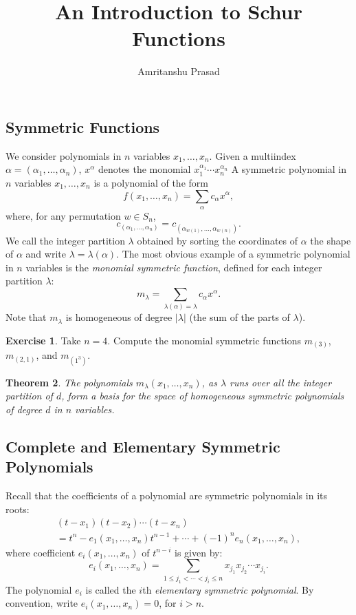 \documentclass[12pt]{amsart}
\title{An Introduction to Schur Functions}
\author{Amritanshu Prasad}
\newtheorem{theorem}{Theorem}[subsection]
\theoremstyle{definition}
\theoremstyle{example}
\newtheorem{exercise}[theorem]{Exercise}
\begin{document}
\maketitle
\renewcommand{\thesubsection}{\arabic{subsection}}
\subsection{Symmetric Functions}
\label{sec:symmetric-functions}
We consider polynomials in $n$ variables $x_1,\dotsc,x_n$.
Given a multiindex $\alpha=(\alpha_1,\dotsc, \alpha_n)$, $x^\alpha$ denotes the monomial $x_1^{\alpha_1}\dotsb x_n^{\alpha_n}$
A symmetric polynomial in $n$ variables $x_1,\dotsc, x_n$ is a polynomial of the form
\begin{displaymath}
  f(x_1,\dotsc, x_n) = \sum_{\alpha} c_\alpha x^\alpha,
\end{displaymath}
where, for any permutation $w\in S_n$,
\begin{displaymath}
  c_{(\alpha_1,\dotsc,\alpha_n)} = c_{(\alpha_{w(1)},\dotsc,\alpha_{w(n)})}.
\end{displaymath}
We call the integer partition $\lambda$ obtained by sorting the coordinates of $\alpha$ the shape of $\alpha$ and write $\lambda = \lambda(\alpha)$.
The most obvious example of a symmetric polynomial in $n$ variables is the \emph{monomial symmetric function}, defined for each integer partition $\lambda$:
\begin{displaymath}
  m_\lambda = \sum_{\lambda(\alpha) = \lambda} c_\alpha x^\alpha.
\end{displaymath}
Note that $m_\lambda$ is homogeneous of degree $|\lambda|$ (the sum of the parts of $\lambda$).
\begin{exercise}
  Take $n=4$. Compute the monomial symmetric functions $m_{(3)}$, $m_{(2,1)}$, and $m_{(1^3)}$.
\end{exercise}
\begin{theorem}
The polynomials $m_\lambda(x_1,\dotsc,x_n)$, as $\lambda$ runs over all the integer partition of $d$, form a basis for the space of homogeneous symmetric polynomials of degree $d$ in $n$ variables.
\end{theorem}
\subsection{Complete and Elementary Symmetric Polynomials}
\label{sec:compl-elem-symm}
Recall that the coefficients of a polynomial are symmetric polynomials in its roots:
\begin{multline}
  \label{eq:elem-id}
  (t-x_1)(t-x_2)\dotsb (t-x_n) \\= t^n - e_1(x_1,\dotsc, x_n)t^{n-1} + \dotsb + (-1)^n e_n(x_1,\dotsc, x_n),
\end{multline}
where coefficient $e_i(x_1,\dotsc, x_n)$ of $t^{n-i}$ is given by:
\begin{equation}
  \label{eq:elem}
  e_i(x_1,\dotsc, x_n) = \sum_{1\leq j_1<\dotsb<j_i\leq n} x_{j_1}x_{j_2}\dotsb x_{j_i}.
\end{equation}
The polynomial $e_i$ is called the $i$th \emph{elementary symmetric polynomial}.
By convention, write $e_i(x_1,\dotsc,x_n)=0$, for $i>n$.
\end{document}
